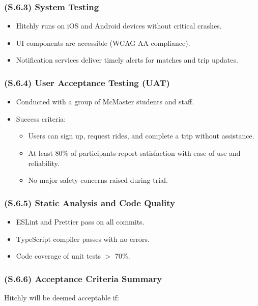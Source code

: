\documentclass[12pt,letterpaper]{article}
\begin{document}
\subsubsection{(S.6.3) System Testing} %
\begin{itemize}
    \item Hitchly runs on iOS and Android devices without critical crashes.
    \item UI components are accessible (WCAG AA compliance).
    \item Notification services deliver timely alerts for matches and trip updates.
\end{itemize}

\subsubsection{(S.6.4) User Acceptance Testing (UAT)} %
\begin{itemize}
    \item Conducted with a group of McMaster students and staff.
    \item Success criteria:
    \begin{itemize}
        \item Users can sign up, request rides, and complete a trip without assistance.
        \item At least 80\% of participants report satisfaction with ease of use and reliability.
        \item No major safety concerns raised during trial.
    \end{itemize}
\end{itemize}

\subsubsection{(S.6.5) Static Analysis and Code Quality} %
\begin{itemize}
    \item ESLint and Prettier pass on all commits.
    \item TypeScript compiler passes with no errors.
    \item Code coverage of unit tests $>$ 70\%.
\end{itemize}

\subsubsection{(S.6.6) Acceptance Criteria Summary} %
Hitchly will be deemed acceptable if:
\end{document}
